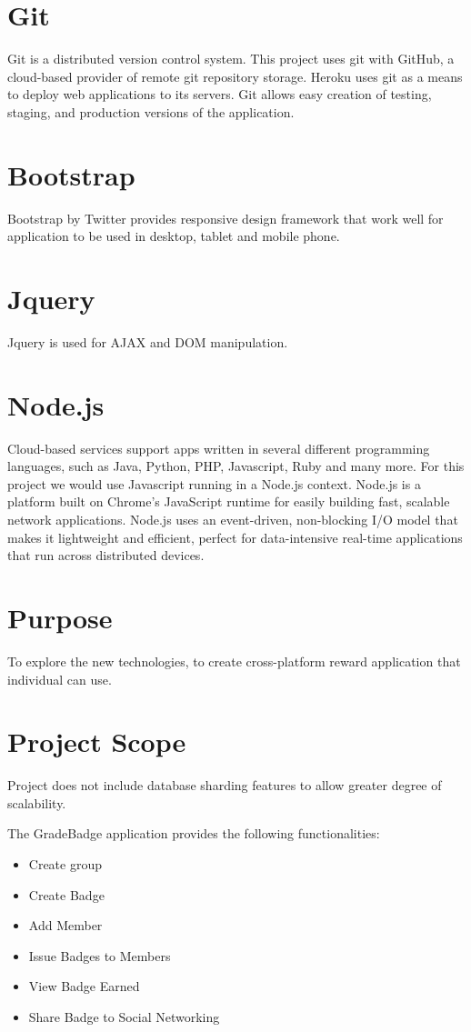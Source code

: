 \section{Git}
Git is a distributed version control system.  This project uses git with GitHub, a cloud-based provider of remote git repository storage.  Heroku uses git as a means to deploy web applications to its servers. Git allows easy creation of testing, staging, and production versions of the application. 

\section{Bootstrap}
Bootstrap by Twitter provides responsive design framework that work well for application to be used in desktop, tablet and mobile phone.

\section{Jquery}
Jquery is used for AJAX and DOM manipulation.

\section{Node.js}
Cloud-based services support apps written in several different programming languages, such as Java, Python, PHP, Javascript, Ruby and many more. For this project we would use Javascript running in a Node.js context. Node.js is a platform built on Chrome's JavaScript runtime for easily building fast, scalable network applications. Node.js uses an event-driven, non-blocking I/O model that makes it lightweight and efficient, perfect for data-intensive real-time applications that run across distributed devices.

\section{Purpose}
To explore the new technologies, to create cross-platform reward application that individual can use.

\section{Project Scope}
Project does not include database sharding features to allow greater degree of scalability. 

The GradeBadge application provides the following functionalities:
\begin{itemize}
\item Create group
\item Create Badge 
\item Add Member
\item Issue Badges to Members
\item View Badge Earned
\item Share Badge to Social Networking 
\end{itemize}

